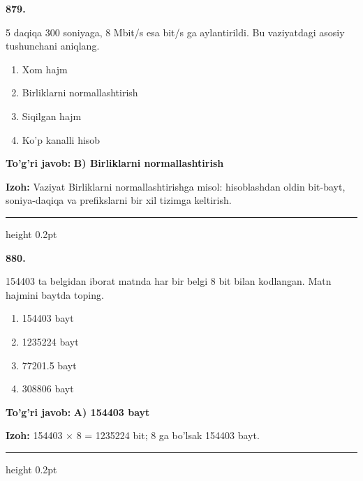 \documentclass[10pt,a4paper,oneside]{article}
\begin{document}
\noindent\textbf{\color{ink}879.}
\par
5 daqiqa 300 soniyaga, 8 Mbit/s esa bit/s ga aylantirildi. Bu vaziyatdagi asosiy tushunchani aniqlang.
\begin{enumerate}[label=\Alph*),leftmargin=9mm]
\item Xom hajm
\item Birliklarni normallashtirish
\item Siqilgan hajm
\item Ko'p kanalli hisob
\end{enumerate}
\begin{tcolorbox}[enhanced,breakable,colback=teal!4,colframe=teal!50!black,boxrule=0.5pt,arc=1.1mm,left=3mm,right=3mm,top=1.7mm,bottom=1.7mm,before skip=2mm,after skip=2mm]
\textbf{\color{teal}To'g'ri javob:} \textbf{B) Birliklarni normallashtirish}
\par\smallskip
\textbf{Izoh:} Vaziyat Birliklarni normallashtirishga misol: hisoblashdan oldin bit-bayt, soniya-daqiqa va prefikslarni bir xil tizimga keltirish.
\end{tcolorbox}
\vspace{2mm}\hrule height 0.2pt \vspace{3mm}

\noindent\textbf{\color{ink}880.}
\par
154403 ta belgidan iborat matnda har bir belgi 8 bit bilan kodlangan. Matn hajmini baytda toping.
\begin{enumerate}[label=\Alph*),leftmargin=9mm]
\item 154403 bayt
\item 1235224 bayt
\item 77201.5 bayt
\item 308806 bayt
\end{enumerate}
\begin{tcolorbox}[enhanced,breakable,colback=teal!4,colframe=teal!50!black,boxrule=0.5pt,arc=1.1mm,left=3mm,right=3mm,top=1.7mm,bottom=1.7mm,before skip=2mm,after skip=2mm]
\textbf{\color{teal}To'g'ri javob:} \textbf{A) 154403 bayt}
\par\smallskip
\textbf{Izoh:} 154403 \ensuremath{\times} 8 = 1235224 bit; 8 ga bo'lsak 154403 bayt.
\end{tcolorbox}
\vspace{2mm}\hrule height 0.2pt \vspace{3mm}
\end{document}
